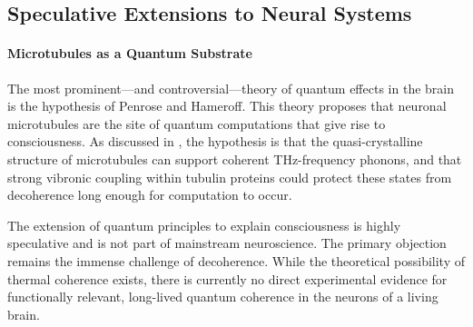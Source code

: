 \subsection{Speculative Extensions to Neural Systems}
\paragraph{Microtubules as a Quantum Substrate}
The most prominent—and controversial—theory of quantum effects in the brain is the  hypothesis of Penrose and Hameroff. This theory proposes that neuronal microtubules are the site of quantum computations that give rise to consciousness. As discussed in , the hypothesis is that the quasi-crystalline structure of microtubules can support coherent THz-frequency phonons, and that strong vibronic coupling within tubulin proteins could protect these states from decoherence long enough for computation to occur.
\begin{warningbox}
The extension of quantum principles to explain consciousness is highly speculative and is not part of mainstream neuroscience. The primary objection remains the immense challenge of decoherence. While the theoretical possibility of thermal coherence exists, there is currently no direct experimental evidence for functionally relevant, long-lived quantum coherence in the neurons of a living brain.
\end{warningbox}

